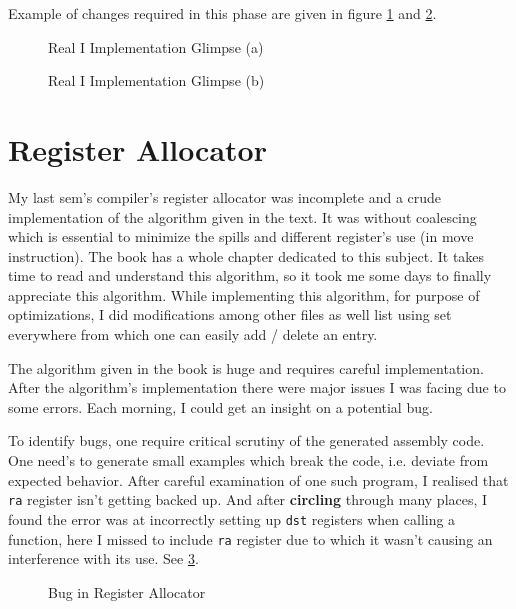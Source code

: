 Example of changes required in this phase are given in figure \ref{fig:rphi1} and \ref{fig:rphi2}.

\begin{figure}
	\centering
	\caption{Real I Implementation Glimpse (a)}
	\label{fig:rphi1}
\end{figure}

\begin{figure}
	\centering
	\caption{Real I Implementation Glimpse (b)}
	\label{fig:rphi2}
\end{figure}

\section{Register Allocator}

My last sem's compiler's register allocator was incomplete and a crude implementation of the algorithm given in the text. It was without coalescing which is essential to minimize the spills and different register's use (in move instruction). The book has a whole chapter dedicated to this subject. It takes time to read and understand this algorithm, so it took me some days to finally appreciate this algorithm. While implementing this algorithm, for purpose of optimizations, I did modifications among other files as well list using set everywhere from which one can easily add / delete an entry.

The algorithm given in the book is huge and requires careful implementation. After the algorithm's implementation there were major issues I was facing due to some errors. Each morning, I could get an insight on a potential bug.

To identify bugs, one require critical scrutiny of the generated assembly code. One need's to generate small examples which break the code, i.e. deviate from expected behavior. After careful examination of one such program, I realised that \texttt{ra} register isn't getting backed up. And after \textbf{circling} through many places, I found the error was at incorrectly setting up \texttt{dst} registers when calling a function, here I missed to include \texttt{ra} register due to which it wasn't causing an interference with its use. See \ref{fig:eb}.

\begin{figure}
	\centering
	\caption{Bug in Register Allocator}
	\label{fig:eb}
\end{figure}

